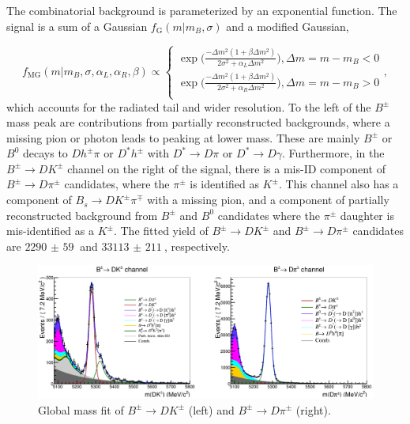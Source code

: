 \documentclass[12pt, a4paper, notitlepage, onecolumn]{article}
\begin{document}
The combinatorial background is parameterized by an exponential function. The signal is a sum of a Gaussian $f_\text{G}(m|m_B, \sigma)$ and a modified Gaussian,

\begin{equation}
  f_\text{MG}(m|m_B, \sigma, \alpha_L, \alpha_R, \beta)\propto
  \begin{cases}
    \exp\Big(\frac{-\Delta m^2(1 + \beta\Delta m^2)}{2\sigma^2 + \alpha_L\Delta m^2}\Big), \Delta m = m - m_B < 0 \\
    \exp\Big(\frac{-\Delta m^2(1 + \beta\Delta m^2)}{2\sigma^2 + \alpha_R\Delta m^2}\Big), \Delta m = m - m_B > 0 \\
  \end{cases},
\end{equation}
which accounts for the radiated tail and wider resolution. To the left of the $B^\pm$ mass peak are contributions from partially reconstructed backgrounds, where a missing pion or photon leads to peaking at lower mass. These are mainly $B^\pm$ or $B^0$ decays to $Dh^\pm\pi$ or $D^*h^\pm$ with $D^*\to D\pi$ or $D^*\to D\gamma$. Furthermore, in the $B^\pm\to DK^\pm$ channel on the right of the signal, there is a mis-ID component of $B^\pm\to D\pi^\pm$ candidates, where the $\pi^\pm$ is identified as $K^\pm$. This channel also has a component of $B_s\to DK^\pm\pi^\mp$ with a missing pion, and a component of partially reconstructed background from $B^\pm$ and $B^0$ candidates where the $\pi^\pm$ daughter is mis-identified as a $K^\pm$. The fitted yield of $B^\pm\to DK^\pm$ and $B^\pm\to D\pi^\pm$ candidates are $\SI{2290(59)}{}$ and $\SI{33113(211)}{}$, respectively.

\begin{figure}[H] 
  \centering
  \includegraphics[width=1\textwidth]{Plots/GlobalFit.png}
  \caption{Global mass fit of $B^\pm\to DK^\pm$ (left) and $B^\pm\to D\pi^\pm$ (right).}
  \label{fig_Bmass_Global}
\end{figure}
\end{document}
